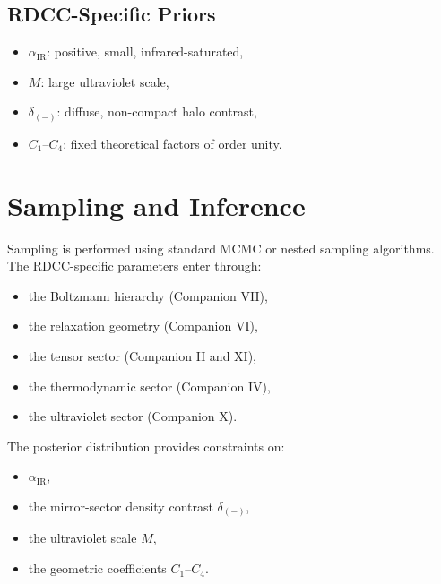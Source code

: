 \documentclass[11pt,a4paper]{article}
\begin{document}
\subsection[RDCC Priors]{RDCC-Specific Priors}

\begin{itemize}[leftmargin=0.8cm]
  \item $\alpha_{\mathrm{IR}}$: positive, small, infrared-saturated,
  \item $M$: large ultraviolet scale,
  \item $\delta_{(-)}$: diffuse, non-compact halo contrast,
  \item $C_1$–$C_4$: fixed theoretical factors of order unity.
\end{itemize}

\section{Sampling and Inference}

Sampling is performed using standard MCMC or nested sampling algorithms. The
RDCC-specific parameters enter through:
\begin{itemize}[leftmargin=0.8cm]
  \item the Boltzmann hierarchy (Companion VII),
  \item the relaxation geometry (Companion VI),
  \item the tensor sector (Companion II and XI),
  \item the thermodynamic sector (Companion IV),
  \item the ultraviolet sector (Companion X).
\end{itemize}

The posterior distribution provides constraints on:
\begin{itemize}[leftmargin=0.8cm]
  \item $\alpha_{\mathrm{IR}}$,
  \item the mirror-sector density contrast $\delta_{(-)}$,
  \item the ultraviolet scale $M$,
  \item the geometric coefficients $C_1$–$C_4$.
\end{itemize}
\end{document}
